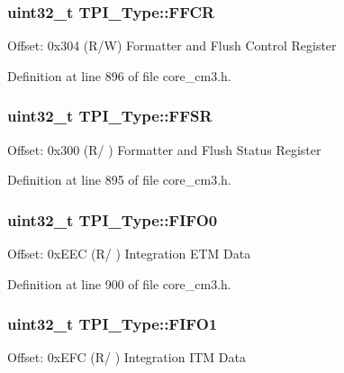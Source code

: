\subsubsection[{\texorpdfstring{F\+F\+CR}{FFCR}}]{ uint32\+\_\+t T\+P\+I\+\_\+\+Type\+::\+F\+F\+CR}\hypertarget{structTPI__Type_a3eb42d69922e340037692424a69da880}{}\label{structTPI__Type_a3eb42d69922e340037692424a69da880}
Offset\+: 0x304 (R/W) Formatter and Flush Control Register 

Definition at line 896 of file core\+\_\+cm3.\+h.

\subsubsection[{\texorpdfstring{F\+F\+SR}{FFSR}}]{ uint32\+\_\+t T\+P\+I\+\_\+\+Type\+::\+F\+F\+SR}\hypertarget{structTPI__Type_ae67849b2c1016fe6ef9095827d16cddd}{}\label{structTPI__Type_ae67849b2c1016fe6ef9095827d16cddd}
Offset\+: 0x300 (R/ ) Formatter and Flush Status Register 

Definition at line 895 of file core\+\_\+cm3.\+h.

\subsubsection[{\texorpdfstring{F\+I\+F\+O0}{FIFO0}}]{ uint32\+\_\+t T\+P\+I\+\_\+\+Type\+::\+F\+I\+F\+O0}\hypertarget{structTPI__Type_ae91ff529e87d8e234343ed31bcdc4f10}{}\label{structTPI__Type_ae91ff529e87d8e234343ed31bcdc4f10}
Offset\+: 0x\+E\+EC (R/ ) Integration E\+TM Data 

Definition at line 900 of file core\+\_\+cm3.\+h.

\subsubsection[{\texorpdfstring{F\+I\+F\+O1}{FIFO1}}]{ uint32\+\_\+t T\+P\+I\+\_\+\+Type\+::\+F\+I\+F\+O1}\hypertarget{structTPI__Type_aebaa9b8dd27f8017dd4f92ecf32bac8e}{}\label{structTPI__Type_aebaa9b8dd27f8017dd4f92ecf32bac8e}
Offset\+: 0x\+E\+FC (R/ ) Integration I\+TM Data 

